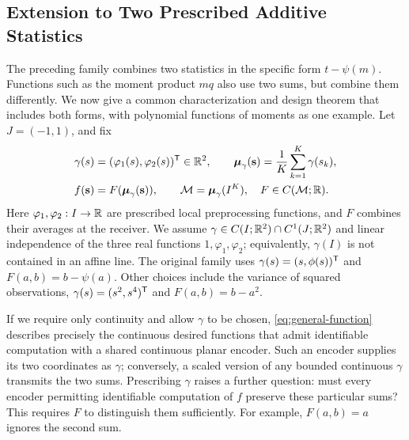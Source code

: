 \subsection{Extension to Two Prescribed Additive Statistics}
\label{sec:polynomial}\label{sec:extension}
The preceding family combines two statistics in the specific form $t-\psi(m)$. Functions such as the moment product $mq$ also use two sums, but combine them differently. We now give a common characterization and design theorem that includes both forms, with polynomial functions of moments as one example. Let $J=(-1,1)$, and fix
\begin{equation}
\begin{aligned}
 \gamma(s)&=(\varphi_1(s),\varphi_2(s))^\mathsf T\in\mathbb R^2,\qquad
 \boldsymbol\mu_\gamma(\mathbf s)=\frac1K\sum_{k=1}^K\gamma(s_k),\\
 f(\mathbf s)&=F(\boldsymbol\mu_\gamma(\mathbf s)),\qquad
 \mathcal M=\boldsymbol\mu_\gamma(I^K),\quad F\in C(\mathcal M;\mathbb R).
\end{aligned}
 \label{eq:general-function}
\end{equation}
Here $\varphi_1,\varphi_2:I\to\mathbb R$ are prescribed local preprocessing functions, and $F$ combines their averages at the receiver. We assume $\gamma\in C(I;\mathbb R^2)\cap C^1(J;\mathbb R^2)$ and linear independence of the three real functions $1,\varphi_1,\varphi_2$; equivalently, $\gamma(I)$ is not contained in an affine line. The original family uses $\gamma(s)=(s,\phi(s))^\mathsf T$ and $F(a,b)=b-\psi(a)$. Other choices include the variance of squared observations, $\gamma(s)=(s^2,s^4)^\mathsf T$ and $F(a,b)=b-a^2$.

If we require only continuity and allow $\gamma$ to be chosen, \eqref{eq:general-function} describes precisely the continuous desired functions that admit identifiable computation with a shared continuous planar encoder. Such an encoder supplies its two coordinates as $\gamma$; conversely, a scaled version of any bounded continuous $\gamma$ transmits the two sums. Prescribing $\gamma$ raises a further question: must every encoder permitting identifiable computation of $f$ preserve these particular sums? This requires $F$ to distinguish them sufficiently. For example, $F(a,b)=a$ ignores the second sum.

